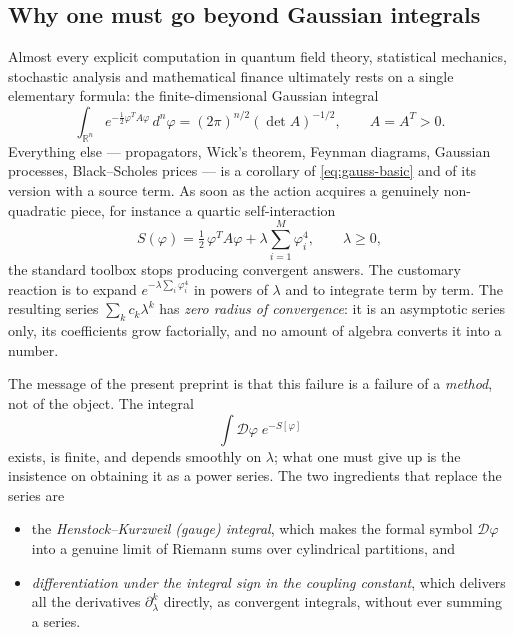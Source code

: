 \documentclass[11pt,a4paper]{article}
\theoremstyle{plain}
\theoremstyle{definition}
\theoremstyle{remark}
\newcommand{\dphi}{\mathcal{D}\varphi}
\newcommand{\R}{\mathbb{R}}
\begin{document}
\subsection{Why one must go beyond Gaussian integrals}

Almost every explicit computation in quantum field theory, statistical mechanics,
stochastic analysis and mathematical finance ultimately rests on a single elementary
formula: the finite-dimensional Gaussian integral
\begin{equation}
\label{eq:gauss-basic}
\int_{\R^{n}} e^{-\frac12\varphi^{T}A\varphi}\,d^{n}\varphi
=(2\pi)^{n/2}(\det A)^{-1/2},
\qquad A=A^{T}>0 .
\end{equation}
Everything else --- propagators, Wick's theorem, Feynman diagrams, Gaussian processes,
Black--Scholes prices --- is a corollary of \eqref{eq:gauss-basic} and of its version with
a source term. As soon as the action acquires a genuinely non-quadratic piece, for
instance a quartic self-interaction
\begin{equation}
\label{eq:action}
S(\varphi)=\tfrac12\,\varphi^{T}A\varphi+\lambda\sum_{i=1}^{M}\varphi_i^{4},
\qquad \lambda\ge 0,
\end{equation}
the standard toolbox stops producing convergent answers. The customary reaction is to
expand $e^{-\lambda\sum_i\varphi_i^4}$ in powers of $\lambda$ and to integrate term by
term. The resulting series
$\sum_k c_k\lambda^k$ has \emph{zero radius of convergence}: it is an asymptotic series
only, its coefficients grow factorially, and no amount of algebra converts it into a
number.

The message of the present preprint is that this failure is a failure of a \emph{method},
not of the object. The integral
\[
\int \dphi \; e^{-S[\varphi]}
\]
exists, is finite, and depends smoothly on $\lambda$; what one must give up is the
insistence on obtaining it as a power series. The two ingredients that replace the series
are

\begin{itemize}
\item the \emph{Henstock--Kurzweil (gauge) integral}, which makes the formal symbol
$\dphi$ into a genuine limit of Riemann sums over cylindrical partitions, and
\item \emph{differentiation under the integral sign in the coupling constant}, which
delivers all the derivatives $\partial_\lambda^k$ directly, as convergent integrals,
without ever summing a series.
\end{itemize}
\end{document}
